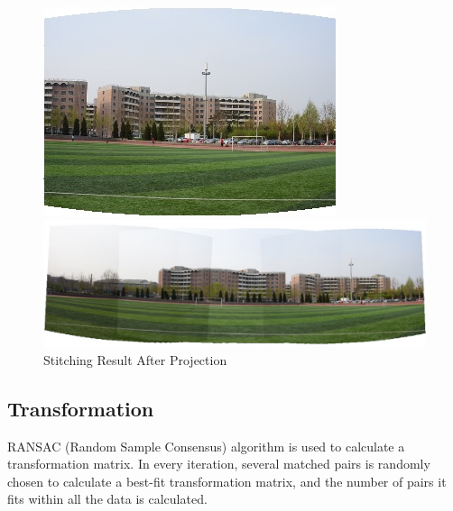 \begin{enumerate}
\begin{figure}[H]
\begin{minipage}[b]{0.24\linewidth}
      \end{minipage}
      \begin{minipage}[b]{0.24\linewidth}
        \includegraphics[scale=0.3]{res/4.png}
      \end{minipage}

      \includegraphics[width=\textwidth]{res/warped_stitch.png}
      \caption{Stitching Result After Projection\label{fig:cyl}}
    \end{figure}

\end{enumerate}

\subsection{Transformation}
RANSAC (Random Sample Consensus) algorithm\cite{ransac} is used to calculate a transformation matrix.
In every iteration, several matched pairs is randomly chosen to calculate a best-fit transformation matrix,
and the number of pairs it fits within all the data is calculated.

